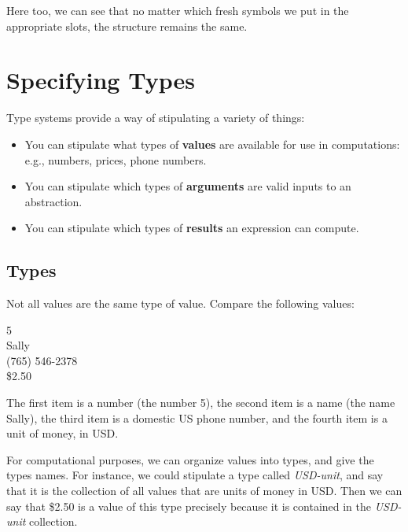 \documentclass{book}
\numberwithin{equation}{chapter}
\newcommand{\vocab}{\textbf}
\begin{document}
\noindent
Here too, we can see that no matter which fresh symbols we put in the appropriate slots, the structure remains the same.


\chapter{Specifying Types}


Type systems provide a way of stipulating a variety of things: 

\begin{itemize}
\item{You can stipulate what types of \vocab{values} are available for use in computations: e.g., numbers, prices, phone numbers.}
\item{You can stipulate which types of \vocab{arguments} are valid inputs to an abstraction.}
\item{You can stipulate which types of \vocab{results} an expression can compute.}
\end{itemize}


\section{Types}

Not all values are the same type of value. Compare the following values:

\begin{center}
5 \\
Sally \\
(765) 546-2378 \\
\$2.50
\end{center}

\noindent
The first item is a number (the number 5), the second item is a name (the name Sally), the third item is a domestic US phone number, and the fourth item is a unit of money, in USD.

For computational purposes, we can organize values into types, and give the types names. For instance, we could stipulate a type called \textit{USD-unit}, and say that it is the collection of all values that are units of money in USD. Then we can say that \$2.50 is a value of this type precisely because it is contained in the \textit{USD-unit} collection.
\end{document}
